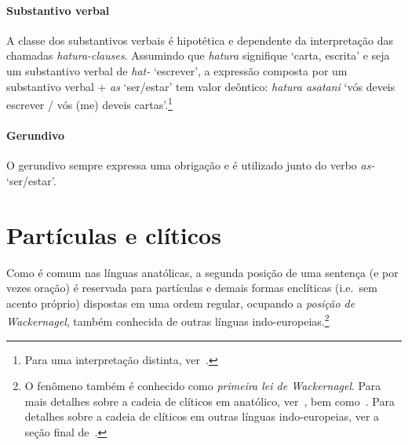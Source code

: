 \paragraph{Substantivo verbal}
A classe dos substantivos verbais é hipotética e dependente da interpretação das
chamadas \emph{\emph{hatura}-clauses}.
Assumindo que \emph{hatura} signifique `carta, escrita' e seja um substantivo
verbal de \emph{hat-} `escrever', a expressão composta por um substantivo
verbal + \emph{as} `ser\slash{}estar' tem valor
deôntico: \emph{hatura asatani} `vós deveis escrever \slash{} vós (me) deveis
cartas'.\footnote{
	Para uma interpretação distinta, ver~\citet{Waal2021}.
}

\paragraph{Gerundivo}
O gerundivo sempre expressa uma obrigação e é utilizado junto do verbo \emph{as-} `ser\slash{}estar'.


\section{Partículas e clíticos}

Como é comum nas línguas anatólicas, a segunda posição de uma sentença (e por
vezes oração) é reservada para partículas e demais formas enclíticas  (i.e.\ sem
acento próprio) dispostas em uma ordem regular, ocupando a \emph{posição de Wackernagel}, também conhecida de
outras línguas indo-europeias.\footnote{O fenômeno também é conhecido como
	\emph{primeira lei de Wackernagel}. Para mais detalhes sobre a cadeia de
	clíticos em anatólico, ver~, bem
	como~\citet{Garret1989,Garret1990,AgbayaniGolston2012}.
	Para detalhes sobre a cadeia de clíticos em outras línguas indo-europeias,
	ver a seção final de~\citet{WackernagelsLawI}.
}


